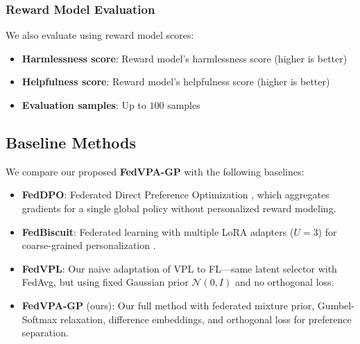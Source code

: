 \subsubsection{Reward Model Evaluation}

We also evaluate using reward model scores:

\begin{itemize}
    \item \textbf{Harmlessness score}: Reward model's harmlessness score (higher is better)
    \item \textbf{Helpfulness score}: Reward model's helpfulness score (higher is better)
    \item \textbf{Evaluation samples}: Up to $100$ samples
\end{itemize}

\subsection{Baseline Methods}

We compare our proposed \textbf{FedVPA-GP} with the following baselines:

\begin{itemize}
    \item \textbf{FedDPO}: Federated Direct Preference Optimization \citep{ye2024openfedllm}, which aggregates gradients for a single global policy without personalized reward modeling.
    \item \textbf{FedBiscuit}: Federated learning with multiple LoRA adapters ($U=3$) for coarse-grained personalization \citep{wu2024towards}.
    \item \textbf{FedVPL}: Our naive adaptation of VPL \citep{poddar2024personalizing} to FL---same latent selector with FedAvg, but using fixed Gaussian prior $\mathcal{N}(0, I)$ and no orthogonal loss.
    \item \textbf{FedVPA-GP} (ours): Our full method with federated mixture prior, Gumbel-Softmax relaxation, difference embeddings, and orthogonal loss for preference separation.
\end{itemize}
